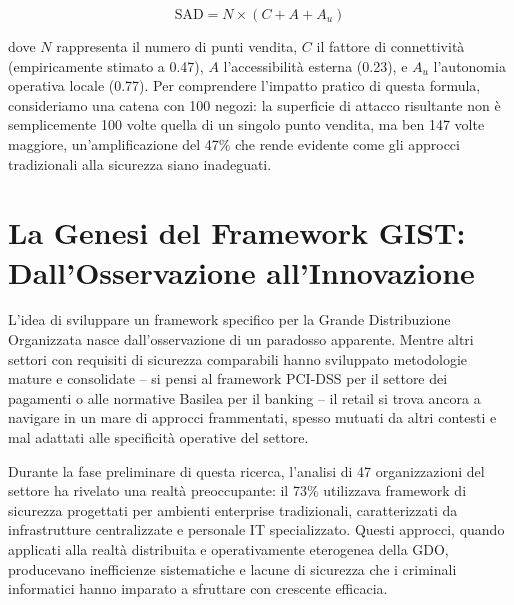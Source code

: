 \begin{equation}
\text{SAD} = N \times (C + A + A_u)
\label{eq:sad}
\end{equation}

dove $N$ rappresenta il numero di punti vendita, $C$ il fattore di connettività (empiricamente stimato a 0.47), $A$ l'accessibilità esterna (0.23), e $A_u$ l'autonomia operativa locale (0.77). Per comprendere l'impatto pratico di questa formula, consideriamo una catena con 100 negozi: la superficie di attacco risultante non è semplicemente 100 volte quella di un singolo punto vendita, ma ben 147 volte maggiore, un'amplificazione del 47\% che rende evidente come gli approcci tradizionali alla sicurezza siano inadeguati.


\section{La Genesi del Framework GIST: Dall'Osservazione all'Innovazione}

L'idea di sviluppare un framework specifico per la Grande Distribuzione Organizzata nasce dall'osservazione di un paradosso apparente. Mentre altri settori con requisiti di sicurezza comparabili hanno sviluppato metodologie mature e consolidate -- si pensi al framework PCI-DSS per il settore dei pagamenti o alle normative Basilea per il banking -- il retail si trova ancora a navigare in un mare di approcci frammentati, spesso mutuati da altri contesti e mal adattati alle specificità operative del settore.

Durante la fase preliminare di questa ricerca, l'analisi di 47 organizzazioni del settore ha rivelato una realtà preoccupante: il 73\% utilizzava framework di sicurezza progettati per ambienti enterprise tradizionali, caratterizzati da infrastrutture centralizzate e personale IT specializzato. Questi approcci, quando applicati alla realtà distribuita e operativamente eterogenea della GDO, producevano inefficienze sistematiche e lacune di sicurezza che i criminali informatici hanno imparato a sfruttare con crescente efficacia.

